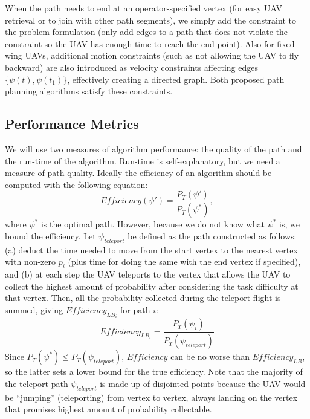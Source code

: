 \documentclass[journal]{IEEEtran}
\begin{document}
When the path needs to end at an operator-specified vertex (for easy UAV retrieval or to join with other path segments), we simply add the constraint to the problem formulation (only add edges to a path that does not violate the constraint so the UAV has enough time to reach the end point). Also for fixed-wing UAVs, additional motion constraints (such as not allowing the UAV to fly backward) are also introduced as velocity constraints affecting edges $\{\psi(t), \psi(t_1)\}$, effectively creating a directed graph. Both proposed path planning algorithms satisfy these constraints.

\subsection{Performance Metrics}

We will use two measures of algorithm performance: the quality of the path and the run-time of the algorithm. Run-time is self-explanatory, but we need a measure of path quality. Ideally the efficiency of an algorithm should be computed with the following equation:
\begin{equation}
\mathit{Efficiency}(\psi') = \frac{P_T(\psi')}{P_T(\psi^*)},
\label{Efficiency}
\end{equation}
where $\psi^*$ is the optimal path. However, because we do not know what $\psi^*$ is, we bound the efficiency. Let $\psi_{teleport}$ be defined as the path constructed as follows: (a) deduct the time needed to move from the start vertex to the nearest vertex with non-zero $p_i$ (plus time for doing the same with the end vertex if specified), and (b) at each step the UAV teleports to the vertex that allows the UAV to collect the highest amount of probability after considering the task difficulty at that vertex. Then, all the probability collected during the teleport flight is summed, giving $\mathit{Efficiency_{LB_i}}$ for path $i$:
\begin{equation}
\mathit{Efficiency_{LB_i}} = \frac{P_T(\psi_i)}{P_T(\psi_{teleport})}
\label{EfficiencyLB}
\end{equation}
Since $P_T(\psi^*) \leq P_T(\psi_{teleport})$, $\mathit{Efficiency}$ can be no worse than $\mathit{Efficiency_{LB}}$, so the latter sets a lower bound for the true efficiency. Note that the majority of the teleport path $\psi_{teleport}$ is made up of disjointed points because the UAV would be ``jumping'' (teleporting) from vertex to vertex, always landing on the vertex that promises highest amount of probability collectable.
\end{document}
